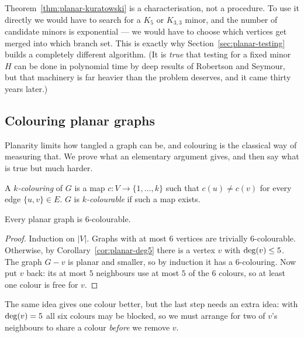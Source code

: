 \begin{remark}\label{rem:planar-no-algo}
Theorem~\ref{thm:planar-kuratowski} is a characterisation, not a procedure. To use it
directly we would have to search for a $K_5$ or $K_{3,3}$ minor, and the number
of candidate minors is exponential --- we would have to choose which vertices
get merged into which branch set. This is exactly why
Section~\ref{sec:planar-testing} builds a completely different algorithm. (It is
\emph{true} that testing for a fixed minor $H$ can be done in polynomial time
by deep results of Robertson and Seymour, but that machinery is far heavier
than the problem deserves, and it came thirty years later.)
\end{remark}

\subsection{Colouring planar graphs}\label{sec:planar-colouring}

Planarity limits how tangled a graph can be, and colouring is the classical
way of measuring that. We prove what an elementary argument gives, and then say
what is true but much harder.

\begin{definition}
A \emph{$k$-colouring} of $G$ is a map $c : V \to \{1,\dots,k\}$ such that
$c(u) \neq c(v)$ for every edge $\{u,v\} \in E$. $G$ is \emph{$k$-colourable}
if such a map exists.
\end{definition}

\begin{proposition}\label{prop:planar-6col}
Every planar graph is $6$-colourable.
\end{proposition}

\begin{proof}
Induction on $|V|$. Graphs with at most $6$ vertices are trivially
$6$-colourable. Otherwise, by Corollary~\ref{cor:planar-deg5} there is a vertex $v$
with $\operatorname{deg}(v) \le 5$. The graph $G - v$ is planar and smaller, so by induction
it has a $6$-colouring. Now put $v$ back: its at most $5$ neighbours use at
most $5$ of the $6$ colours, so at least one colour is free for $v$.
\end{proof}

The same idea gives one colour better, but the last step needs an extra idea:
with $\operatorname{deg}(v) = 5$ all six colours may be blocked, so we must arrange for two of
$v$'s neighbours to share a colour \emph{before} we remove $v$.

